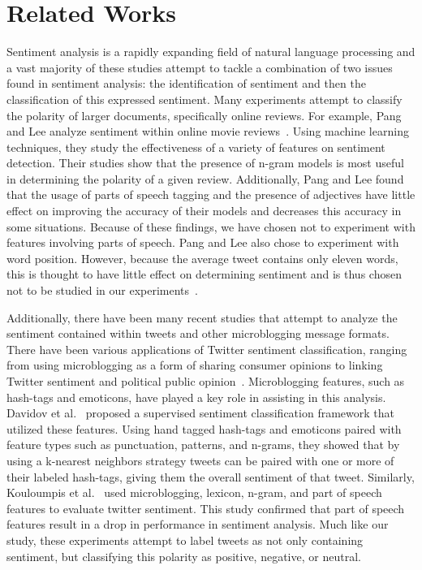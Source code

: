 \documentclass[11pt]{article}
\begin{document}
\section{Related Works}
Sentiment analysis is a rapidly expanding field of natural language processing and a vast majority of these studies attempt to tackle a combination of two issues found in sentiment analysis: the identification of sentiment and then the classification of this expressed sentiment.  Many experiments attempt to classify the polarity of larger documents, specifically online reviews. For example, Pang and Lee analyze sentiment within online movie reviews~\cite{pang2002thumbs}. Using machine learning techniques, they study the effectiveness of a variety of features on sentiment detection. Their studies show that the presence of n-gram models is most useful in determining the polarity of a given review. Additionally, Pang and Lee found that the usage of parts of speech tagging and the presence of adjectives have little effect on improving the accuracy of their models and decreases this accuracy in some situations. Because of these findings, we have chosen not to experiment with features involving parts of speech. Pang and Lee also chose to experiment with word position. However, because the average tweet contains only eleven words, this is thought to have little effect on determining sentiment and is thus chosen not to be studied in our experiments~\cite{oconnor2010tweets}.

Additionally, there have been many recent studies that attempt to analyze the sentiment contained within tweets and other microblogging message formats. There have been various applications of Twitter sentiment classification, ranging from using microblogging as a form of sharing consumer opinions to linking Twitter sentiment and political public opinion~\cite{jansen2009twitter,oconnor2010tweets}. Microblogging features, such as hash-tags and emoticons, have played a key role in assisting in this analysis. Davidov et al.~ proposed a supervised sentiment classification framework that utilized these features. Using hand tagged hash-tags and emoticons paired with feature types such as punctuation, patterns, and n-grams, they showed that by using a k-nearest neighbors strategy tweets can be paired with one or more of their labeled hash-tags, giving them the overall sentiment of that tweet. Similarly, Kouloumpis et al.~ used microblogging, lexicon, n-gram, and part of speech features to evaluate twitter sentiment. This study confirmed that part of speech features result in a drop in performance in sentiment analysis.  Much like our study, these experiments attempt to label tweets as not only containing sentiment, but classifying this polarity as positive, negative, or neutral. 
\end{document}

